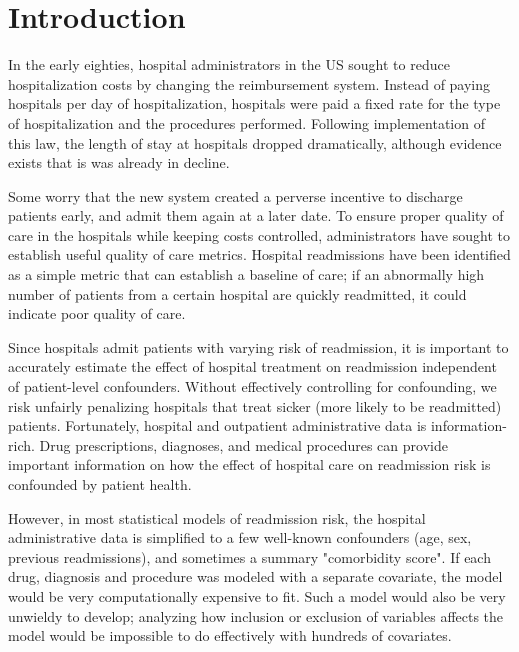 \documentclass[]{article}\usepackage[]{graphicx}\usepackage[]{color}
\begin{document}
\section{Introduction}
In the early eighties, hospital administrators in the US sought to reduce hospitalization costs by changing the reimbursement system. Instead of paying hospitals per day of hospitalization, hospitals were paid a fixed rate for the type of hospitalization and the procedures performed. Following implementation of this law, the length of stay at hospitals dropped dramatically, although evidence exists that is was already in decline. 

Some worry that the new system created a perverse incentive to discharge patients early, and admit them again at a later date. To ensure proper quality of care in the hospitals while keeping costs controlled, administrators have sought to establish useful quality of care metrics. Hospital readmissions have been identified as a simple metric that can establish a baseline of care; if an abnormally high number of patients from a certain hospital are quickly readmitted, it could indicate poor quality of care. 

Since hospitals admit patients with varying risk of readmission, it is important to accurately estimate the effect of hospital treatment on readmission independent of patient-level confounders. Without effectively controlling for confounding, we risk unfairly penalizing hospitals that treat sicker (more likely to be readmitted) patients. Fortunately, hospital and outpatient administrative data is information-rich. Drug prescriptions, diagnoses, and medical procedures can provide important information on how the effect of hospital care on readmission risk is confounded by patient health. 

However, in most statistical models of readmission risk, the hospital administrative data is simplified to a few well-known confounders (age, sex, previous readmissions), and sometimes a summary "comorbidity score". If each drug, diagnosis and procedure was modeled with a separate covariate, the model would be very computationally expensive to fit. Such a model would also be very unwieldy to develop; analyzing how inclusion or exclusion of variables affects the model would be impossible to do effectively with hundreds of covariates. 
\end{document}
